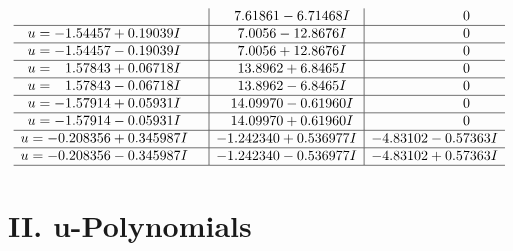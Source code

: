 \documentclass[1p]{elsarticle_modified}
\theoremstyle{definition}
\begin{document}
$$\begin{array}{c|c|c}
 & \phantom{-}7.61861 - 6.71468 I & \phantom{-0.000000 } 0 \\ \hline\begin{aligned}
u &= -1.54457 + 0.19039 I\end{aligned}
 & \phantom{-}7.0056 - 12.8676 I & \phantom{-0.000000 } 0 \\ \hline\begin{aligned}
u &= -1.54457 - 0.19039 I\end{aligned}
 & \phantom{-}7.0056 + 12.8676 I & \phantom{-0.000000 } 0 \\ \hline\begin{aligned}
u &= \phantom{-}1.57843 + 0.06718 I\end{aligned}
 & \phantom{-}13.8962 + 6.8465 I & \phantom{-0.000000 } 0 \\ \hline\begin{aligned}
u &= \phantom{-}1.57843 - 0.06718 I\end{aligned}
 & \phantom{-}13.8962 - 6.8465 I & \phantom{-0.000000 } 0 \\ \hline\begin{aligned}
u &= -1.57914 + 0.05931 I\end{aligned}
 & \phantom{-}14.09970 - 0.61960 I & \phantom{-0.000000 } 0 \\ \hline\begin{aligned}
u &= -1.57914 - 0.05931 I\end{aligned}
 & \phantom{-}14.09970 + 0.61960 I & \phantom{-0.000000 } 0 \\ \hline\begin{aligned}
u &= -0.208356 + 0.345987 I\end{aligned}
 & -1.242340 + 0.536977 I & -4.83102 - 0.57363 I \\ \hline\begin{aligned}
u &= -0.208356 - 0.345987 I\end{aligned}
 & -1.242340 - 0.536977 I & -4.83102 + 0.57363 I\\
 \hline 
 \end{array}$$\newpage
\newpage\renewcommand{\arraystretch}{1}
\centering \section*{ II. u-Polynomials}
\end{document}
